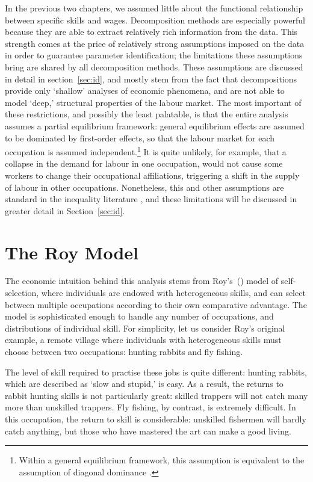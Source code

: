 In the previous two chapters, we assumed little about the functional relationship between specific skills and wages. Decomposition methods are especially powerful because they are able to extract relatively rich information from the data. This strength comes at the price of relatively strong assumptions imposed on the data in order to guarantee parameter identification; the limitations these assumptions bring are shared by all decomposition methods. These assumptions are discussed in detail in section~\ref{sec:id}, and mostly stem from the fact that decompositions provide only `shallow' analyses of economic phenomena, and are not able to model `deep,' structural properties of the labour market. The most important of these restrictions, and possibly the least palatable, is that the entire analysis assumes a partial equilibrium framework: general equilibrium effects are assumed to be dominated by first-order effects, so that the labour market for each occupation is assumed independent.\footnote{Within a general equilibrium framework, this assumption is equivalent to the assumption of diagonal dominance \citep[p.233]{Arrow1971}.} It is quite unlikely, for example, that a collapse in the demand for labour in one occupation, would not cause some workers to change their occupational affiliations, triggering a shift in the supply of labour in other occupations. Nonetheless, this and other assumptions are standard in the inequality literature \citep[p.1]{Fortin2011}, and these limitations will be discussed in greater detail in Section~\ref{sec:id}.

\section{The Roy Model}
The economic intuition behind this analysis stems from Roy's~(\citeyear{Roy1951}) model of self-selection, where individuals are endowed with heterogeneous skills, and can select between multiple occupations according to their own comparative advantage. The model is sophisticated enough to handle any number of occupations, and distributions of individual skill. For simplicity, let us consider Roy's original example, a remote village where individuals with heterogeneous skills must choose between two occupations: hunting rabbits and fly fishing. 

The level of skill required to practise these jobs is quite different: hunting rabbits, which are described as `slow and stupid,' is easy. As a result, the returns to rabbit hunting skills is not particularly great: skilled trappers will not catch many more than unskilled trappers. Fly fishing, by contrast, is extremely difficult. In this occupation, the return to skill is considerable: unskilled fishermen will hardly catch anything, but those who have mastered the art can make a good living.

